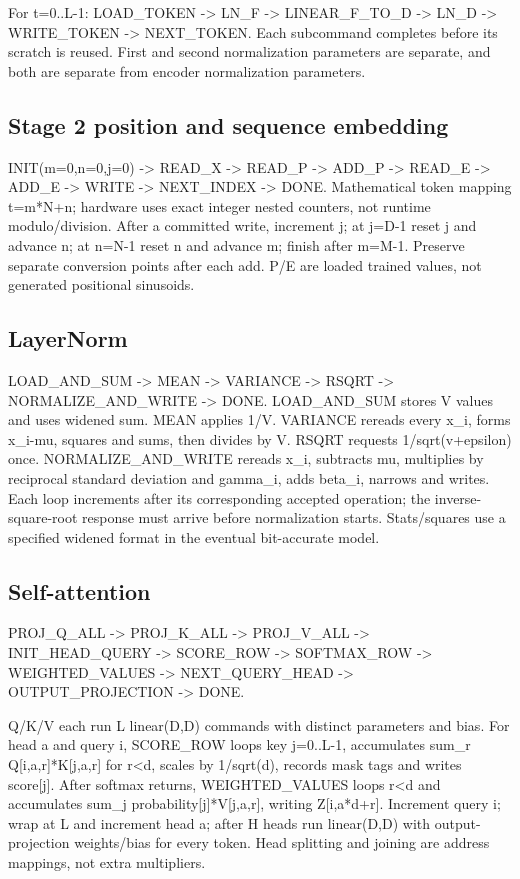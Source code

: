 \documentclass[11pt,a4paper]{article}
\begin{document}
For t=0..L-1: LOAD\_TOKEN -> LN\_F -> LINEAR\_F\_TO\_D -> LN\_D -> WRITE\_TOKEN -> NEXT\_TOKEN. Each subcommand completes before its scratch is reused. First and second normalization parameters are separate, and both are separate from encoder normalization parameters.

\subsection{Stage 2 position and sequence embedding}

INIT(m=0,n=0,j=0) -> READ\_X -> READ\_P -> ADD\_P -> READ\_E -> ADD\_E -> WRITE -> NEXT\_INDEX -> DONE. Mathematical token mapping t=m*N+n; hardware uses exact integer nested counters, not runtime modulo/division. After a committed write, increment j; at j=D-1 reset j and advance n; at n=N-1 reset n and advance m; finish after m=M-1. Preserve separate conversion points after each add. P/E are loaded trained values, not generated positional sinusoids.

\subsection{LayerNorm}

LOAD\_AND\_SUM -> MEAN -> VARIANCE -> RSQRT -> NORMALIZE\_AND\_WRITE -> DONE. LOAD\_AND\_SUM stores V values and uses widened sum. MEAN applies 1/V. VARIANCE rereads every x\_i, forms x\_i-mu, squares and sums, then divides by V. RSQRT requests 1/sqrt(v+epsilon) once. NORMALIZE\_AND\_WRITE rereads x\_i, subtracts mu, multiplies by reciprocal standard deviation and gamma\_i, adds beta\_i, narrows and writes. Each loop increments after its corresponding accepted operation; the inverse-square-root response must arrive before normalization starts. Stats/squares use a specified widened format in the eventual bit-accurate model.

\subsection{Self-attention}

PROJ\_Q\_ALL -> PROJ\_K\_ALL -> PROJ\_V\_ALL -> INIT\_HEAD\_QUERY -> SCORE\_ROW -> SOFTMAX\_ROW -> WEIGHTED\_VALUES -> NEXT\_QUERY\_HEAD -> OUTPUT\_PROJECTION -> DONE.

Q/K/V each run L linear(D,D) commands with distinct parameters and bias. For head a and query i, SCORE\_ROW loops key j=0..L-1, accumulates sum\_r Q[i,a,r]*K[j,a,r] for r<d, scales by 1/sqrt(d), records mask tags and writes score[j]. After softmax returns, WEIGHTED\_VALUES loops r<d and accumulates sum\_j probability[j]*V[j,a,r], writing Z[i,a*d+r]. Increment query i; wrap at L and increment head a; after H heads run linear(D,D) with output-projection weights/bias for every token. Head splitting and joining are address mappings, not extra multipliers.
\end{document}
